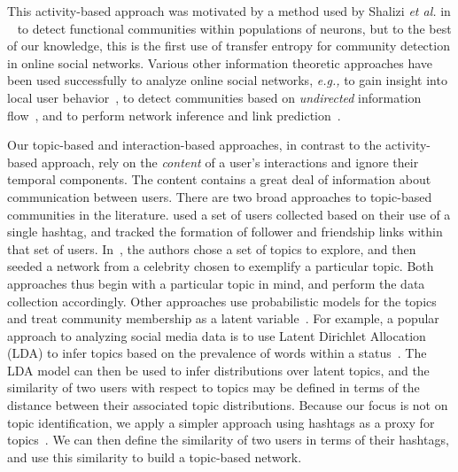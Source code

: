 This activity-based approach was motivated by a method used by Shalizi \emph{et al.} in ~\cite{shalizi2007discovering} to detect functional communities within populations of neurons, but to the best of our knowledge, this is the first use of transfer entropy for community detection in online social networks. Various other information theoretic approaches have been used successfully to analyze online social networks, \emph{e.g.,} to gain insight into local user behavior~\cite{darmon2013understanding}, to detect communities based on \emph{undirected} information flow~\cite{darmon2013detecting}, and to perform network inference and link prediction~\cite{ver2012information}.


Our topic-based and interaction-based approaches, in contrast to the activity-based approach, rely on the \emph{content} of a user's interactions and ignore their temporal components. The content contains a great deal of information about communication between users.
There are two broad approaches to topic-based communities in the literature. \cite{rossi2012conversation} used a set of users collected based on their use of a single hashtag, and tracked the formation of follower and friendship links within that set of users. In~\cite{lim2012following}, the authors chose a set of topics to explore, and then seeded a network from a celebrity chosen to exemplify a particular topic. Both approaches thus begin with a particular topic in mind, and perform the data collection accordingly. Other approaches use probabilistic models for the topics and treat community membership as a latent variable~\cite{yin2012latent}.
For example, a popular approach to analyzing social media data is to use Latent Dirichlet Allocation (LDA) to infer topics based on the prevalence of words within a status~\cite{zhao2011comparing,michelson2010discovering}. The LDA model can then be used to infer distributions over latent topics, and the similarity of two users with respect to topics may be defined in terms of the distance between their associated topic distributions. Because our focus is not on topic identification, we apply a simpler approach using hashtags as a proxy for topics~\cite{becker2011beyond,tsur2012s}. We can then define the similarity of two users in terms of their hashtags, and use this similarity to build a topic-based network.

